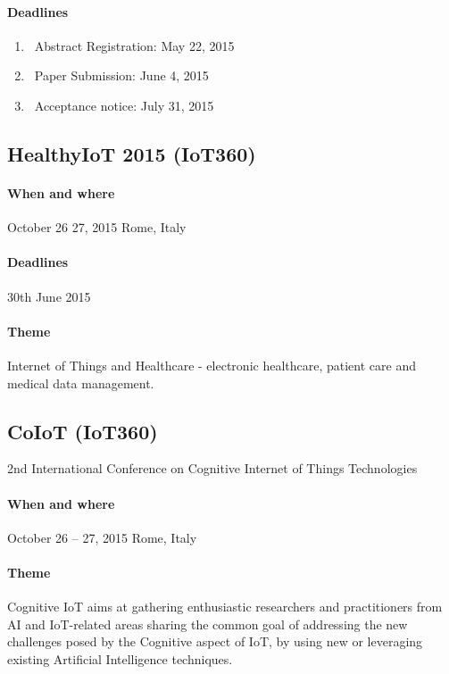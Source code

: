 \documentclass[12pt]{article}
\begin{document}
\paragraph{Deadlines}
\begin{enumerate}
\item\ Abstract Registration: May 22, 2015
\item\ Paper Submission: June 4, 2015
\item\ Acceptance notice: July 31, 2015

\end{enumerate}

\subsection {HealthyIoT 2015 (IoT360) }

\paragraph {When and where} October 26 27, 2015 Rome, Italy

\paragraph {Deadlines} 30th June 2015

\paragraph {Theme} Internet of Things and Healthcare - electronic healthcare, patient care and medical data management.


\subsection {CoIoT (IoT360)} 2nd International Conference on Cognitive Internet of Things Technologies
\paragraph {When and where}  October 26 – 27, 2015 Rome, Italy
\paragraph {Theme} Cognitive IoT aims at gathering enthusiastic researchers and practitioners from AI and IoT-related areas sharing the common goal of addressing the new challenges posed by the Cognitive aspect of IoT, by using new or leveraging existing Artificial Intelligence techniques.
\end{document}
